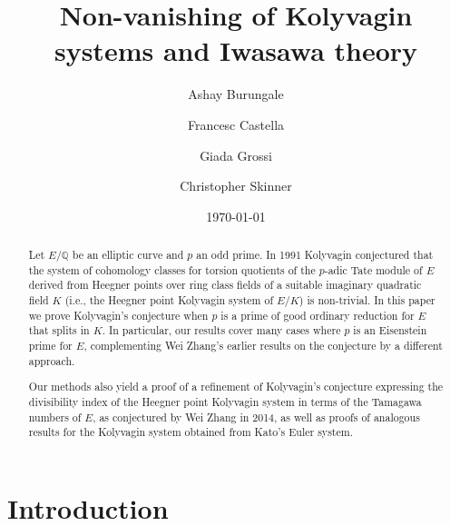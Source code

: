 \documentclass[10pt,reqno]{amsart}
\numberwithin{equation}{section}
\theoremstyle{plain}
\theoremstyle{definition}
\theoremstyle{definition}
\theoremstyle{plain}
\theoremstyle{plain}
\theoremstyle{plain}
\theoremstyle{plain}
\theoremstyle{plain}
\theoremstyle{plain}
\newcommand{\Q}{\mathbb{Q}}
\begin{document}
\title{Non-vanishing of Kolyvagin systems and Iwasawa theory}

\author{Ashay Burungale}
\address[A.~Burungale]{University of Texas at Austin, USA}

\author{Francesc Castella}
\address[F.~Castella]{University of California Santa Barbara, South Hall, Santa Barbara, CA 93106, USA}

\author{Giada Grossi}
\address[G.~Grossi]{CNRS, Institut Galilée, Université Sorbonne Paris Nord, 93430 Villetaneuse, FRANCE}

 
\author{Christopher Skinner} 
\address[C.~Skinner]{Princeton University, Fine Hall, Washington Road, Princeton, NJ 08544-1000, USA}


\begin{abstract}
Let $E/\Q$ be an elliptic curve and $p$ an odd prime. In 1991 Kolyvagin conjectured that the system of cohomology classes for torsion quotients of the $p$-adic Tate module of $E$
derived from Heegner points over ring class fields of 
a suitable imaginary quadratic field $K$ (i.e., the Heegner point Kolyvagin system of $E/K$) is non-trivial. 
In this paper we prove Kolyvagin's conjecture when $p$ is a prime of good ordinary reduction for $E$ that splits in $K$. %
In particular, 
our results cover many cases where $p$ is an Eisenstein prime for $E$, complementing Wei Zhang's earlier results on the conjecture by a  different approach.

Our methods also yield a proof of a refinement of Kolyvagin's conjecture expressing the divisibility index of the Heegner point Kolyvagin system in terms of the Tamagawa numbers of $E$, as conjectured by Wei Zhang in 2014, as well as proofs of analogous results for the Kolyvagin system obtained from Kato's Euler system. 
\end{abstract}

\date{\today}
\maketitle
\tableofcontents



\section*{Introduction}
\end{document}
